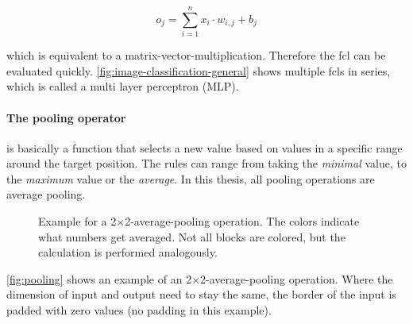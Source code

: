 \begin{equation}
    \label{eq:fcl} 
    o_j = \sum\limits_{i=1}^{n} x_i\cdot w_{i, j} + b_j
\end{equation}

which is equivalent to a matrix-vector-multiplication. Therefore the fcl can be evaluated quickly.
\autoref{fig:image-classification-general} shows multiple fcls in series, which is called a multi layer perceptron (MLP). 

\paragraph{The pooling operator} is basically a function that selects a new value based on values in a specific range around the target position.
The rules can range from taking the \emph{minimal} value, to the \emph{maximum} value or the \emph{average}.
In this thesis, all pooling operations are average pooling.

\begin{figure}[htbp]
    \centering
    \vspace{-0.2cm}
    \caption{
        Example for a 2$\times$2-average-pooling operation. The colors indicate what numbers get averaged. 
        Not all blocks are colored, but the calculation is performed analogously.
    }
    \label{fig:pooling}
\end{figure}

\autoref{fig:pooling} shows an example of an 2$\times$2-average-pooling operation.
Where the dimension of input and output need to stay the same, the border of the input is padded with zero values (no padding in this example).